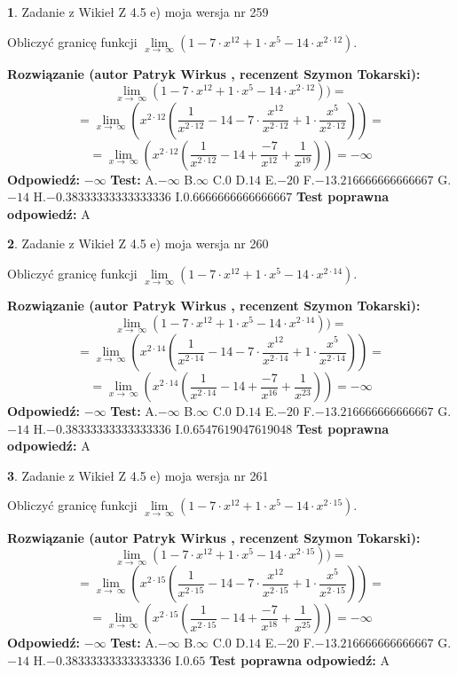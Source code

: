 \documentclass[12pt, a4paper]{article}
\theoremstyle{definition} %
\newtheorem{zad}{}
\newcommand{\zadStart}[1]{\begin{zad}#1\newline}
\newcommand{\zadStop}{\end{zad}}
\newcommand{\rozwStart}[2]{\noindent \textbf{Rozwiązanie (autor #1 , recenzent #2): }\newline}
\newcommand{\rozwStop}{\newline}
\newcommand{\odpStart}{\noindent \textbf{Odpowiedź:}\newline}
\newcommand{\odpStop}{\newline}
\newcommand{\testStart}{\noindent \textbf{Test:}\newline}
\newcommand{\testStop}{\newline}
\newcommand{\kluczStart}{\noindent \textbf{Test poprawna odpowiedź:}\newline}
\newcommand{\kluczStop}{\newline}
\begin{document}
\zadStart{Zadanie z Wikieł Z 4.5 e) moja wersja nr 259}


Obliczyć granicę funkcji  $\lim\limits_{x\to\ \infty}(1 - 7 \cdot x^{12}+1 \cdot x^{5}- 14 \cdot x^{2\cdot12})$.
\zadStop
\rozwStart{Patryk Wirkus}{Szymon Tokarski}
$$\lim\limits_{x\to\ \infty}(1 - 7 \cdot x^{12}+1 \cdot x^{5}- 14 \cdot x^{2\cdot12}))=$$
$$=\lim\limits_{x\to\ \infty}(x^{2\cdot12}(\frac{1}{x^{2\cdot12}}-14 -7 \cdot \frac{x^{12}}{x^{2\cdot12}}+1 \cdot \frac{x^{5}}{x^{2\cdot12}}))=$$
$$=\lim\limits_{x\to\ \infty}(x^{2\cdot12}(\frac{1}{x^{2\cdot12}}-14 + \frac{-7}{x^{12}}+ \frac{1}{x^{19}}))=-\infty$$
\rozwStop
\odpStart
$-\infty$
\odpStop
\testStart
A.$-\infty$ B.$\infty$ C.$0$ D.$14$ E.$-20$
F.$-13.216666666666667$ G.$-14$
H.$-0.38333333333333336$
I.$0.6666666666666667$
\testStop
\kluczStart
A
\kluczStop



\zadStart{Zadanie z Wikieł Z 4.5 e) moja wersja nr 260}


Obliczyć granicę funkcji  $\lim\limits_{x\to\ \infty}(1 - 7 \cdot x^{12}+1 \cdot x^{5}- 14 \cdot x^{2\cdot14})$.
\zadStop
\rozwStart{Patryk Wirkus}{Szymon Tokarski}
$$\lim\limits_{x\to\ \infty}(1 - 7 \cdot x^{12}+1 \cdot x^{5}- 14 \cdot x^{2\cdot14}))=$$
$$=\lim\limits_{x\to\ \infty}(x^{2\cdot14}(\frac{1}{x^{2\cdot14}}-14 -7 \cdot \frac{x^{12}}{x^{2\cdot14}}+1 \cdot \frac{x^{5}}{x^{2\cdot14}}))=$$
$$=\lim\limits_{x\to\ \infty}(x^{2\cdot14}(\frac{1}{x^{2\cdot14}}-14 + \frac{-7}{x^{16}}+ \frac{1}{x^{23}}))=-\infty$$
\rozwStop
\odpStart
$-\infty$
\odpStop
\testStart
A.$-\infty$ B.$\infty$ C.$0$ D.$14$ E.$-20$
F.$-13.216666666666667$ G.$-14$
H.$-0.38333333333333336$
I.$0.6547619047619048$
\testStop
\kluczStart
A
\kluczStop



\zadStart{Zadanie z Wikieł Z 4.5 e) moja wersja nr 261}


Obliczyć granicę funkcji  $\lim\limits_{x\to\ \infty}(1 - 7 \cdot x^{12}+1 \cdot x^{5}- 14 \cdot x^{2\cdot15})$.
\zadStop
\rozwStart{Patryk Wirkus}{Szymon Tokarski}
$$\lim\limits_{x\to\ \infty}(1 - 7 \cdot x^{12}+1 \cdot x^{5}- 14 \cdot x^{2\cdot15}))=$$
$$=\lim\limits_{x\to\ \infty}(x^{2\cdot15}(\frac{1}{x^{2\cdot15}}-14 -7 \cdot \frac{x^{12}}{x^{2\cdot15}}+1 \cdot \frac{x^{5}}{x^{2\cdot15}}))=$$
$$=\lim\limits_{x\to\ \infty}(x^{2\cdot15}(\frac{1}{x^{2\cdot15}}-14 + \frac{-7}{x^{18}}+ \frac{1}{x^{25}}))=-\infty$$
\rozwStop
\odpStart
$-\infty$
\odpStop
\testStart
A.$-\infty$ B.$\infty$ C.$0$ D.$14$ E.$-20$
F.$-13.216666666666667$ G.$-14$
H.$-0.38333333333333336$
I.$0.65$
\testStop
\kluczStart
A
\kluczStop
\end{document}
